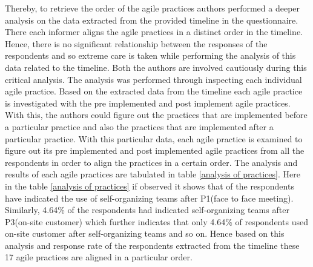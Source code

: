 \documentclass[a4paper,oneside]{bth}
\begin{document}
Thereby, to retrieve the order of the agile practices authors performed a deeper analysis on the data extracted from the provided timeline in the questionnaire. There each informer aligns the agile practices in a distinct order in the timeline. Hence, there is no significant relationship between the responses of the respondents and so extreme care is taken while performing the analysis of this data related to the timeline. Both the authors are involved cautiously during this critical analysis. The analysis was performed through inspecting each individual agile practice. Based on the extracted data from the timeline each agile practice is investigated with the pre implemented and post implement agile practices. With this, the authors could figure out the practices that are implemented before a particular practice and also the practices that are implemented after a particular practice. With this particular data, each agile practice is examined to figure out its pre implemented and post implemented agile practices from all the respondents in order to align the practices in a certain order. The analysis and results of each agile practices are tabulated in table \ref{analysis of practices}. Here in the table \ref{analysis of practices} if observed it shows that of the respondents have indicated the use of self-organizing teams after P1(face to face meeting). Similarly, 4.64\% of the respondents had indicated self-organizing teams after P3(on-site customer) which further indicates that only 4.64\% of respondents used on-site customer after self-organizing teams and so on. Hence based on this analysis and response rate of the respondents extracted from the timeline these 17 agile practices are aligned in a particular order.
\end{document}
